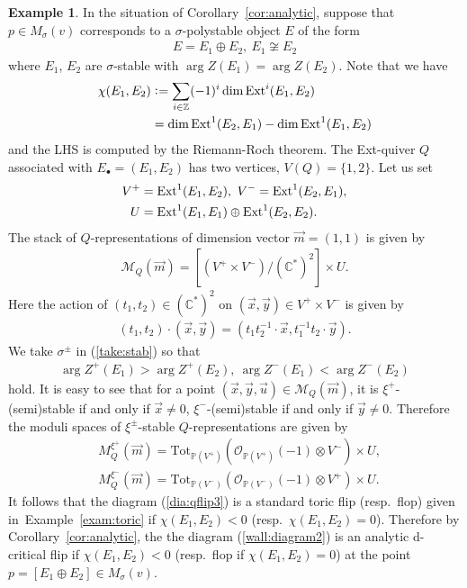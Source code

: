 \documentclass[11pt]{amsart}
\theoremstyle{plain}
\theoremstyle{definition}
\newtheorem{exam}[thm]{Example}
\theoremstyle{remark}
\newcommand{\mM}{\mathcal{M}}
\newcommand{\oO}{\mathcal{O}}
\newcommand{\Ext}{\mathop{\rm Ext}\nolimits}
\begin{document}
\begin{exam}\label{subsec:dflop}
In the situation of Corollary~\ref{cor:analytic}, 
suppose that $p \in M_{\sigma}(v)$ 
corresponds to a
$\sigma$-polystable object $E$
of the form
\begin{align*}
E=E_1 \oplus E_2, \ E_1 \not\cong E_2
\end{align*}
 where 
$E_1$, $E_2$ are $\sigma$-stable 
with $\arg Z(E_1)=\arg Z(E_2)$. 
Note that we have
\begin{align*}
\chi(E_1, E_2) &\cneq \sum_{ i \in \mathbb{Z}}
(-1)^i \dim \Ext^i(E_1, E_2) \\
&=\dim \Ext^1(E_2, E_1)-\dim \Ext^1(E_1, E_2)
\end{align*}
and the LHS is computed by the Riemann-Roch theorem. 
The Ext-quiver $Q$ 
associated with $E_{\bullet}=(E_1, E_2)$
has 
two vertices, $V(Q)=\{1, 2\}$. 
Let us set
\begin{align*}
V^+ &=\Ext^1(E_1, E_2), \ 
V^-=\Ext^1(E_2, E_1), \\ 
U &=\Ext^1(E_1, E_1) \oplus \Ext^1(E_2, E_2).
\end{align*}
The stack of $Q$-representations of dimension vector 
$\vec{m}=(1, 1)$ is given by
\begin{align*}
\mM_Q(\vec{m})=
[(V^+ \times V^-)/(\mathbb{C}^{\ast})^2] \times U. 
\end{align*}
Here 
the action of 
$(t_1, t_2) \in (\mathbb{C}^{\ast})^2$ on 
$(\vec{x}, \vec{y}) \in V^+ \times V^-$ is given by 
\begin{align*}
(t_1, t_2)
\cdot (\vec{x}, \vec{y})=
(t_1 t_2^{-1} \cdot \vec{x}, t_1^{-1} t_2 \cdot \vec{y}).
\end{align*}
We take $\sigma^{\pm}$ in (\ref{take:stab})
so that 
\begin{align*}
\arg Z^{+}(E_1)>\arg Z^{+}(E_2), \ 
\arg Z^{-}(E_1)<\arg Z^{-}(E_2)
\end{align*}
hold. 
It is easy to see that 
for a point 
$(\vec{x}, \vec{y}, \vec{u}) \in  
\mM_Q(\vec{m})$, 
it is 
$\xi^+$-(semi)stable if and only if $\vec{x} \neq 0$, 
$\xi^-$-(semi)stable if and only if $\vec{y} \neq 0$. 
Therefore the moduli spaces of $\xi^{\pm}$-stable 
$Q$-representations are given by
\begin{align*}
&M_Q^{\xi^{+}}(\vec{m})=
\mathrm{Tot}_{\mathbb{P}(V^+)}(\oO_{\mathbb{P}(V^+)}(-1) \otimes
V^-) \times U, \\ 
&M_Q^{\xi^{-}}(\vec{m})=
\mathrm{Tot}_{\mathbb{P}(V^-)}
(\oO_{\mathbb{P}(V^-)}(-1) \otimes
V^+) \times U.
\end{align*}
It follows that the diagram (\ref{dia:qflip3}) is a 
standard toric flip (resp.~flop) 
given in~Example~\ref{exam:toric}
if 
$\chi(E_1, E_2)<0$ (resp.~$\chi(E_1, E_2)=0$).
Therefore by Corollary~\ref{cor:analytic}, the  
the diagram (\ref{wall:diagram2}) is an analytic d-critical 
flip if $\chi(E_1, E_2)<0$ (resp.~flop if $\chi(E_1, E_2)=0$) 
at the point $p=[E_1 \oplus E_2] \in M_{\sigma}(v)$. 
\end{exam}
\end{document}
